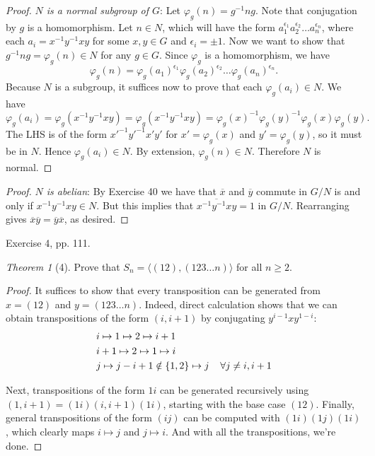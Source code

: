 \documentclass[12pt]{article}
\theoremstyle{remark}
\theoremstyle{named}
\newtheorem*{theorem}{Theorem}
\renewcommand{\bar}{\overline}
\begin{document}
\begin{proof}
    \textit{\(N\) is a normal subgroup of \(G\)}: Let \(\varphi_g(n) = g^{-1}ng\). Note that conjugation by \(g\) is a homomorphism. Let \(n \in N\), which will have the form \(a_1^{\epsilon_1} a_2^{\epsilon_2} \dots a_n^{\epsilon_n}\), where each \(a_i = x^{-1}y^{-1}xy\) for some \(x, y \in G\) and \(\epsilon_i = \pm 1\). Now we want to show that \(g^{-1}ng = \varphi_g(n) \in N\) for any \(g \in G\). Since \(\varphi_g\) is a homomorphism, we have 
    \[\varphi_g(n) = \varphi_g(a_1)^{\epsilon_1} \varphi_g(a_2)^{\epsilon_2} \dots \varphi_g(a_n)^{\epsilon_n}.\]
    Because \(N\) is a subgroup, it suffices now to prove that each \(\varphi_g(a_i) \in N\). We have \[\varphi_g(a_i) = \varphi_g(x^{-1}y^{-1}xy) = \varphi_g(x^{-1}y^{-1}xy) = \varphi_g(x)^{-1}\varphi_g(y)^{-1}\varphi_g(x)\varphi_g(y).\]
    The LHS is of the form \(x'^{-1}y'^{-1}x'y'\) for \(x' = \varphi_g(x)\) and \(y' = \varphi_g(y)\), so it must be in \(N\). Hence \(\varphi_g(a_i) \in N\). By extension, \(\varphi_g(n) \in N\). Therefore \(N\) is normal.
\end{proof}

\begin{proof}
    \textit{\(N\) is abelian}: By Exercise 40 we have that \(\bar x\) and \(\bar y\) commute in \(G/N\) is and only if \(x^{-1}y^{-1}xy \in N\). But this implies that \(\bar{x^{-1}y^{-1}xy} = 1\) in \(G / N\). Rearranging gives \(\bar x \bar y = \bar y \bar x\), as desired. 
\end{proof}

Exercise 4, pp. 111.

\begin{theorem}[4]
    Prove that \(S_n = \langle (12), (123\dots n)\rangle\) for all \(n \ge 2\).
\end{theorem}

\begin{proof}
    It suffices to show that every transposition can be generated from \(x = (12)\) and \(y = (123 \dots n)\). Indeed, direct calculation shows that we can obtain transpositions of the form \((i, i+1)\) by conjugating \(y^{i - 1} x y^{1-i}\):
    \begin{align*}
        &i \mapsto 1 \mapsto 2 \mapsto i + 1 \\
        &i + 1 \mapsto 2 \mapsto 1 \mapsto i \\
        &j \mapsto j - i + 1 \notin \{1, 2\} \mapsto j \hspace{4mm} \forall j \ne i, i + 1 \\
    \end{align*}
    
    Next, transpositions of the form \(1i\) can be generated recursively using \((1, i + 1) = (1i)(i, i + 1)(1i)\), starting with the base case \((12)\). Finally, general transpositions of the form \((ij)\) can be computed with \((1i)(1j)(1i)\), which clearly maps \(i \mapsto j\) and \(j \mapsto i\). And with all the transpositions, we're done.
\end{proof}
\end{document}
